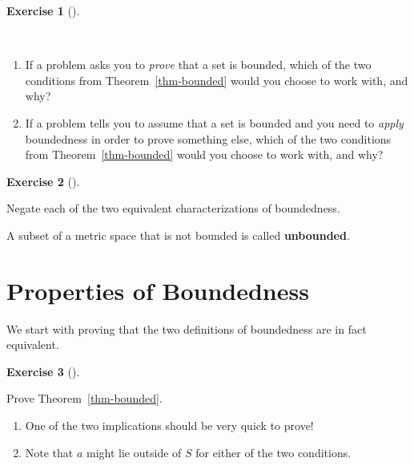 \documentclass[
  letterpaper,
  DIV=11,
  numbers=noendperiod]{scrreprt}
\providecommand{\tightlist}{%
  \setlength{\itemsep}{0pt}\setlength{\parskip}{0pt}}
\theoremstyle{plain}
\theoremstyle{definition}
\newtheorem{exercise}{Exercise}[chapter]
\theoremstyle{plain}
\theoremstyle{plain}
\theoremstyle{definition}
\theoremstyle{definition}
\theoremstyle{remark}
\begin{document}
\begin{exercise}[]\protect\hypertarget{exr-boundedness-tfae-reflection}{}\label{exr-boundedness-tfae-reflection}

~

\begin{enumerate}
\def\labelenumi{\arabic{enumi}.}
\tightlist
\item
  If a problem asks you to \emph{prove} that a set is bounded, which of
  the two conditions from Theorem~\ref{thm-bounded} would you choose to
  work with, and why?
\item
  If a problem tells you to assume that a set is bounded and you need to
  \emph{apply} boundedness in order to prove something else, which of
  the two conditions from Theorem~\ref{thm-bounded} would you choose to
  work with, and why?
\end{enumerate}

\end{exercise}

\begin{exercise}[]\protect\hypertarget{exr-unbounded}{}\label{exr-unbounded}

Negate each of the two equivalent characterizations of boundedness.

\end{exercise}

A subset of a metric space that is not bounded is called
\textbf{unbounded}.

\section{Properties of Boundedness}\label{properties-of-boundedness}

We start with proving that the two definitions of boundedness are in
fact equivalent.

\begin{exercise}[]\protect\hypertarget{exr-bounded-tfae-proof}{}\label{exr-bounded-tfae-proof}

Prove Theorem~\ref{thm-bounded}.

\end{exercise}

\begin{tcolorbox}[enhanced jigsaw, titlerule=0mm, opacitybacktitle=0.6, leftrule=.75mm, bottomrule=.15mm, left=2mm, arc=.35mm, colback=white, rightrule=.15mm, colframe=quarto-callout-tip-color-frame, toptitle=1mm, breakable, opacityback=0, colbacktitle=quarto-callout-tip-color!10!white, bottomtitle=1mm, title=\textcolor{quarto-callout-tip-color}{\faLightbulb}\hspace{0.5em}{Hint}, coltitle=black, toprule=.15mm]

\begin{enumerate}
\def\labelenumi{\arabic{enumi}.}
\tightlist
\item
  One of the two implications should be very quick to prove!
\item
  Note that \(a\) might lie outside of \(S\) for either of the two
  conditions.
\end{enumerate}

\end{tcolorbox}
\end{document}
